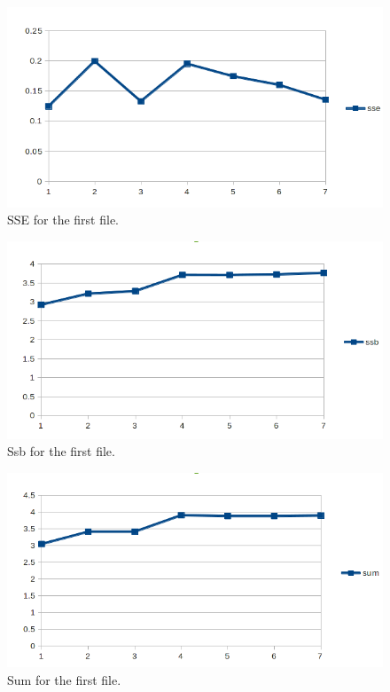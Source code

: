 \documentclass[12pt, a4paper]{article}
\begin{document}
\begin{figure}[htb]
    \centering
    \includegraphics[width=\textwidth]{sse1} 
    \caption{SSE for the first file.}
    \label{fig:2}
\end{figure}

\begin{figure}[htb]
    \centering
    \includegraphics[width=\textwidth]{ssb1}
    \caption{Ssb for the first file.}
    \label{fig:3}
\end{figure}

\begin{figure}[htb]
    \centering
    \includegraphics[width=\textwidth]{sum1}
    \caption{Sum for the first file.}
    \label{fig:4}
\end{figure}
\end{document}

